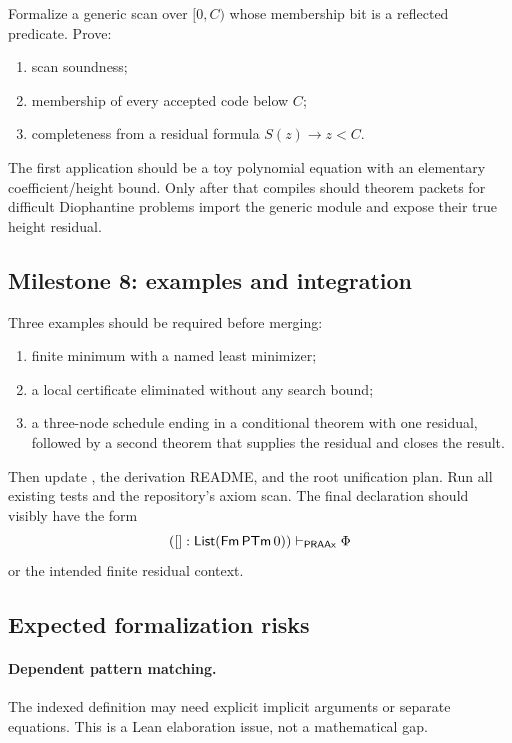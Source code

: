 Formalize a generic scan over \([0,C)\) whose membership bit is a reflected predicate.  Prove:

\begin{enumerate}
\item scan soundness;
\item membership of every accepted code below \(C\);
\item completeness from a residual formula \(S(z)\to z<C\).
\end{enumerate}

The first application should be a toy polynomial equation with an elementary coefficient/height
bound.  Only after that compiles should theorem packets for difficult Diophantine problems import the
generic module and expose their true height residual.

\subsection{Milestone 8: examples and integration}

Three examples should be required before merging:

\begin{enumerate}
\item finite minimum with a named least minimizer;
\item a local certificate eliminated without any search bound;
\item a three-node schedule ending in a conditional theorem with one residual, followed by a second
      theorem that supplies the residual and closes the result.
\end{enumerate}

Then update , the derivation README, and the root unification plan.  Run
all existing tests and the repository's axiom scan.  The final declaration should visibly have the
form
\[
 ([]:\mathsf{List}(\mathsf{Fm}\,\mathsf{PTm}\,0))\vdash_{\mathsf{PRAAx}}\Phi
\]
or the intended finite residual context.

\subsection{Expected formalization risks}

\paragraph{Dependent pattern matching.}
The indexed  definition may need explicit implicit arguments or separate equations.
This is a Lean elaboration issue, not a mathematical gap.

